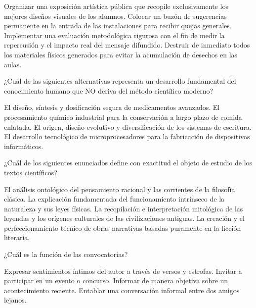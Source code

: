\documentclass[12pt]{evaluasep}
\begin{document}
\begin{questions}
    \begin{choices}
        \choice Organizar una exposición artística pública que recopile exclusivamente los mejores diseños visuales de los alumnos.
        \choice Colocar un buzón de sugerencias permanente en la entrada de las instalaciones para recibir quejas generales.
        \CorrectChoice Implementar una evaluación metodológica rigurosa con el fin de medir la repercusión y el impacto real del mensaje difundido.
        \choice Destruir de inmediato todos los materiales físicos generados para evitar la acumulación de desechos en las aulas.
    
    \end{choices}
    

    \question ¿Cuál de las siguientes alternativas representa un desarrollo fundamental del conocimiento humano que NO deriva del método científico moderno?
    
    \begin{choices}
        \choice El diseño, síntesis y dosificación segura de medicamentos avanzados.
        \choice El procesamiento químico industrial para la conservación a largo plazo de comida enlatada.
        \CorrectChoice El origen, diseño evolutivo y diversificación de los sistemas de escritura.
        \choice El desarrollo tecnológico de microprocesadores para la fabricación de dispositivos informáticos.
    
    \end{choices}
    

    \question ¿Cuál de los siguientes enunciados define con exactitud el objeto de estudio de los textos científicos?
    
    \begin{choices}
        \choice El análisis ontológico del pensamiento racional y las corrientes de la filosofía clásica.
        \CorrectChoice La explicación fundamentada del funcionamiento intrínseco de la naturaleza y sus leyes físicas.
        \choice La recopilación e interpretación mitológica de las leyendas y los orígenes culturales de las civilizaciones antiguas.
        \choice La creación y el perfeccionamiento técnico de obras narrativas basadas puramente en la ficción literaria.
    
    \end{choices}
    

                \question ¿Cuál es la función de las convocatorias?
    
                \begin{choices}
        \choice Expresar sentimientos íntimos del autor a través de versos y estrofas.
        \CorrectChoice Invitar a participar en un evento o concurso.
        \choice Informar de manera objetiva sobre un acontecimiento reciente.
        \choice Entablar una conversación informal entre dos amigos lejanos.
    

\end{choices}
\end{questions}
\end{document}

